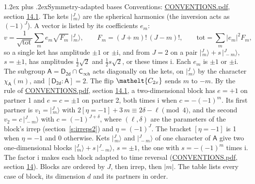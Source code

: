 \documentclass[10pt,a4paper]{article}
\makeatletter
\renewcommand\section{\@startsection{section}{1}{\z@}{-3ex plus -1ex minus -.2ex}%
  {1.2ex plus .2ex}{\normalfont\large\sffamily\bfseries\color{parttitle}}}
\numberwithin{equation}{section}
\newcommand{\eltfont}[1]{{\let\sigma\eltsigma\mathelt{#1}}}
\newcommand{\grp}[1]{\mathsf{#1}}
\newcommand{\elt}[1]{\eltfont{#1}}
\newcommand{\grpindex}[2]{[#1 : #2]}
\newcommand{\iverson}[1]{[#1]}
\newcommand{\iunit}{\mathrm{i}}
\newcommand{\chiA}{\chi_{\grp{A}}}
\newcommand{\jm}[2]{\bigl\lvert{}^{#1}_{\,#2}\bigr\rangle}
\makeatother
\begin{document}
\section{Symmetry-adapted bases}\label{s:bases}
Conventions: \href{../../CONVENTIONS.pdf}{CONVENTIONS.pdf}, section \href{../../CONVENTIONS.pdf\#conv.14.1}{14.1}.
\leavevmode\label{n:index.m}\label{n:vector.ket}The kets $\jm{J}{m}$ are the spherical harmonics (the inversion acts as $(-1)^J$). \label{n:index.ketcoefficient}\label{n:vector.basis.symmetry}\label{n:index.ketweight}\label{n:index.total}A vector is listed by its coefficients $e_m$:
\begin{equation}\label{e:ket}v = \frac{1}{\sqrt{\mathrm{tot}}}\sum_m e_m\sqrt{F_m}\;\jm{J}{m},\qquad F_m = (J+m)!\,(J-m)!,\qquad \mathrm{tot} = \sum_m |e_m|^2F_m,\end{equation}
\leavevmode\label{n:index.pair.sign}so a single ket has amplitude $\pm1$ or $\pm\iunit$, and from $J = 2$ on a pair $\jm{J}{m} + s\,\jm{J}{-m}$, $s = \pm1$, has amplitudes $\tfrac{1}{2}\sqrt{2}$ and $\tfrac{1}{2}s\sqrt{2}$, or these times $\iunit$. Each $e_m$ is $\pm1$ or $\pm\iunit$.
\leavevmode\label{n:group.A}\label{n:function.character.abelian}The subgroup $\grp{A} = \grp{D_{2d}}\cap\grp{C_{\infty h}}$ acts diagonally on the kets, on $\jm{J}{m}$ by the character $\chiA(m)$, and $\grpindex{\grp{D_{2d}}}{\grp{A}} = 2$. The flip $\elt{C_{2x}}$ sends $m$ to $-m$. \label{n:index.partner.sign}By the rule of \href{../../CONVENTIONS.pdf}{CONVENTIONS.pdf}, section \href{../../CONVENTIONS.pdf\#conv.14.1}{14.1}, a two-dimensional block has $e = +1$ on partner 1 and $e = c = \pm1$ on partner 2, both times $\iunit$ when $c = -(-1)^m$. \label{n:index.eta}Its first partner is $v_1 = \jm{J}{m}$ with $2\iverson{\eta = -1} + 3\,m \equiv 2\delta - \ell \pmod{4}$, and the second $v_2 = c\,\jm{J}{-m}$ with $c = (-1)^{J+\delta}$, where $(\ell, \delta)$ are the parameters of the block's irrep (section~\ref{s:irreps2}) and $\eta = (-1)^J$. The bracket $\iverson{\eta = -1}$ is 1 when $\eta = -1$ and 0 otherwise. Kets $\jm{J}{m}$ and $\jm{J}{-m}$ of one character of $\grp{A}$ give two one-dimensional blocks $\jm{J}{m} + s\,\jm{J}{-m}$, $s = \pm1$, the one with $s = -(-1)^m$ times $\iunit$. The factor $\iunit$ makes each block adapted to time reversal (\href{../../CONVENTIONS.pdf}{CONVENTIONS.pdf}, section \href{../../CONVENTIONS.pdf\#conv.14}{14}). Blocks are ordered by $J$, then irrep, then $|m|$.
\leavevmode\label{n:head.case}\label{n:head.partners}The table lists every case of block, its dimension $d$ and its partners in order.
\end{document}
